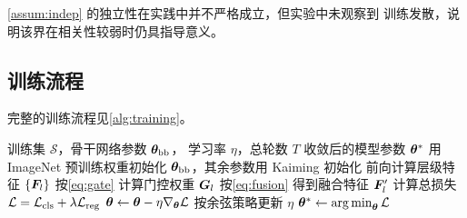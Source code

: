 \begin{remark}
  \label{rmk:relax}
  \cref{assum:indep} 的独立性在实践中并不严格成立，但实验中未观察到
  训练发散，说明该界在相关性较弱时仍具指导意义。
\end{remark}

\subsection{训练流程}
\label{sec:method:train}

完整的训练流程见\cref{alg:training}。

\begin{algorithm}[htbp]
  \caption{\ourmethod{} 的训练流程}
  \label{alg:training}
  \begin{algorithmic}[1]
    \Require 训练集 $\mathcal{S}$，骨干网络参数 $\bm{\theta}_{\mathrm{bb}}$，
             学习率 $\eta$，总轮数 $T$
    \Ensure  收敛后的模型参数 $\bm{\theta}^{*}$
    \State 用 ImageNet 预训练权重初始化 $\bm{\theta}_{\mathrm{bb}}$，其余参数用
           Kaiming 初始化
        \State 前向计算层级特征 $\{\bm{F}_l\}$
          \State 按\cref{eq:gate} 计算门控权重 $\bm{G}_l$
          \State 按\cref{eq:fusion} 得到融合特征 $\bm{F}_l'$
        \EndFor
        \State 计算总损失 $\mathcal{L} = \mathcal{L}_{\mathrm{cls}} + \lambda \mathcal{L}_{\mathrm{reg}}$
        \State $\bm{\theta} \gets \bm{\theta} - \eta \nabla_{\bm{\theta}} \mathcal{L}$
      \EndFor
      \State 按余弦策略更新 $\eta$
    \EndFor
    \State \Return $\bm{\theta}^{*} \gets \operatorname*{arg\,min}_{\bm{\theta}} \mathcal{L}$
  \end{algorithmic}
\end{algorithm}
